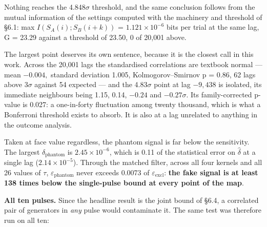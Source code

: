 \documentclass[
  11pt,
]{article}
\begin{document}
Nothing reaches the 4.848\(\sigma\) threshold, and the same conclusion
follows from the mutual information of the settings computed with the
machinery and threshold of \S6.1: max \(I(S_A(i) ; S_B(i+k))\) =
\(1.121 \times 10^{-6}\) bits per trial at the same lag, G = 23.29
against a threshold of 23.50, 0 of 20,001 above.

The largest point deserves its own sentence, because it is the closest
call in this work. Across the 20,001 lags the standardised correlations
are textbook normal --- mean \(-0.004,\) standard deviation 1.005,
Kolmogorov--Smirnov p = 0.86, 62 lags above 3\(\sigma\) against 54
expected --- and the 4.83\(\sigma\) point at lag \(-9,438\) is isolated,
its immediate neighbours being 1.15, 0.14, \(-0.24\) and
\(-0.27 \sigma\). Its family-corrected p-value is 0.027: a one-in-forty
fluctuation among twenty thousand, which is what a Bonferroni threshold
exists to absorb. It is also at a lag unrelated to anything in the
outcome analysis.

Taken at face value regardless, the phantom signal is far below the
sensitivity. The largest \(\delta_{\mathrm{phantom}}\) is
\(2.45 \times 10^{-6}\), which is 0.11 of the statistical error on
\(\hat\delta\) at a single lag (\(2.14 \times 10^{-5}\)). Through the
matched filter, across all four kernels and all 26 values of \(\tau\),
\(\varepsilon_{\mathrm{phantom}}\) never exceeds 0.0073 of
\(\varepsilon_{\mathrm{excl}}\): \textbf{the fake signal is at least 138
times below the single-pulse bound at every point of the map}.

\textbf{All ten pulses.} Since the headline result is the joint bound of
\S6.4, a correlated pair of generators in \emph{any} pulse would
contaminate it. The same test was therefore run on all ten:
\end{document}

